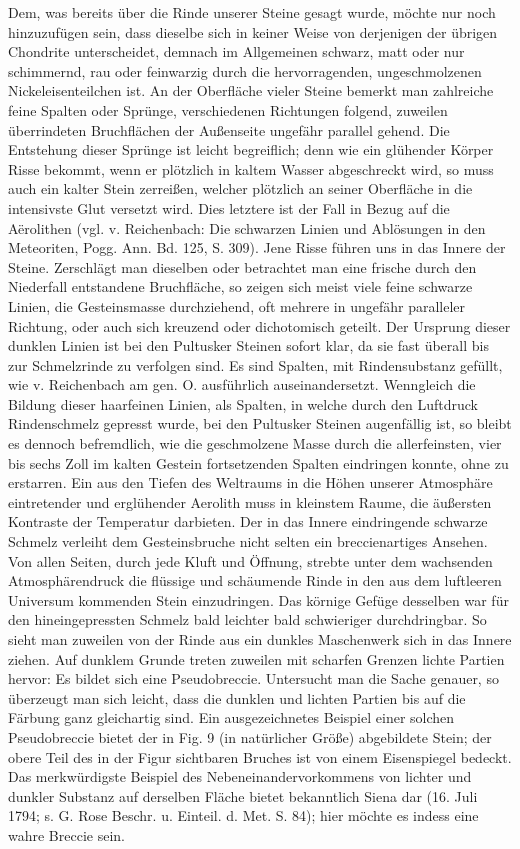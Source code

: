 \documentclass[a4paper, 11pt, oneside, german]{article}
\begin{document}
Dem, was bereits über die Rinde unserer Steine gesagt wurde, möchte nur noch hinzuzufügen sein, dass dieselbe sich in keiner Weise von derjenigen der übrigen Chondrite unterscheidet, demnach im Allgemeinen schwarz, matt oder nur schimmernd, rau oder feinwarzig durch die hervorragenden, ungeschmolzenen Nickeleisenteilchen ist. An der Oberfläche vieler Steine bemerkt man zahlreiche feine Spalten oder Sprünge, verschiedenen Richtungen folgend, zuweilen überrindeten Bruchflächen der Außenseite ungefähr parallel gehend. Die Entstehung dieser Sprünge ist leicht begreiflich; denn wie ein glühender Körper Risse bekommt, wenn er plötzlich in kaltem Wasser abgeschreckt wird, so muss auch ein kalter Stein zerreißen, welcher plötzlich an seiner Oberfläche in die intensivste Glut versetzt wird. Dies letztere ist der Fall in Bezug auf die Aërolithen (vgl. v. Reichenbach: Die schwarzen Linien und Ablösungen in den Meteoriten, Pogg. Ann. Bd. 125, S. 309). Jene Risse führen uns in das Innere der Steine. Zerschlägt man dieselben oder betrachtet man eine frische durch den Niederfall entstandene Bruchfläche, so zeigen sich meist viele feine schwarze Linien, die Gesteinsmasse durchziehend, oft mehrere in ungefähr paralleler Richtung, oder auch sich kreuzend oder dichotomisch geteilt. Der Ursprung dieser dunklen Linien ist bei den Pultusker Steinen sofort klar, da sie fast überall bis zur Schmelzrinde zu verfolgen sind. Es sind Spalten, mit Rindensubstanz gefüllt, wie v. Reichenbach am gen. O. ausführlich auseinandersetzt. Wenngleich die Bildung dieser haarfeinen Linien, als Spalten, in welche durch den Luftdruck Rindenschmelz gepresst wurde, bei den Pultusker Steinen augenfällig ist, so bleibt es dennoch befremdlich, wie die geschmolzene Masse durch die allerfeinsten, vier bis sechs Zoll im kalten Gestein fortsetzenden Spalten eindringen konnte, ohne zu erstarren. Ein aus den Tiefen des Weltraums in die Höhen unserer Atmosphäre eintretender und erglühender Aerolith muss in kleinstem Raume, die äußersten Kontraste der Temperatur darbieten. Der in das Innere eindringende schwarze Schmelz verleiht dem Gesteinsbruche nicht selten ein breccienartiges Ansehen. Von allen Seiten, durch jede Kluft und Öffnung, strebte unter dem wachsenden Atmosphärendruck die flüssige und schäumende Rinde in den aus dem luftleeren Universum kommenden Stein einzudringen. Das körnige Gefüge desselben war für den hineingepressten Schmelz bald leichter bald schwieriger durchdringbar. So sieht man zuweilen von der Rinde aus ein dunkles Maschenwerk sich in das Innere ziehen. Auf dunklem Grunde treten zuweilen mit scharfen Grenzen lichte Partien hervor: Es bildet sich eine Pseudobreccie. Untersucht man die Sache genauer, so überzeugt man sich leicht, dass die dunklen und lichten Partien bis auf die Färbung ganz gleichartig sind. Ein ausgezeichnetes Beispiel einer solchen Pseudobreccie bietet der in Fig. 9 (in natürlicher Größe) abgebildete Stein; der obere Teil des in der Figur sichtbaren Bruches ist von einem Eisenspiegel bedeckt. Das merkwürdigste Beispiel des Nebeneinandervorkommens von lichter und dunkler Substanz auf derselben Fläche bietet bekanntlich Siena dar (16. Juli 1794; s. G. Rose Beschr. u. Einteil. d. Met. S. 84); hier möchte es indess eine wahre Breccie sein.
\end{document}
